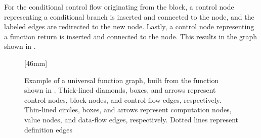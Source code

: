 %
For the conditional control flow originating from the 
\gls{block}, a \gls{control node} representing a conditional branch is inserted
and connected to the  \gls{node}, and the labeled \glspl{edge}
are redirected to the new \gls{node}.
%
Lastly, a \gls{control node} representing a \gls{function} return is inserted
and connected to the  \gls{node}.
%
This results in the \gls{graph} shown in
.

\begin{figure}
  \centering

  \mbox{}%
  \hfill%
                [46mm]%
                {%
                }%
  \hfill%
                {%
                }%
  \hfill%
  \mbox{}

  \vspace{\betweensubfigures}

                {%
                  \parbox{\textwidth}{%
                    \parbox[b]{32mm}{%
                    }%
                    \hfill%
                    \parbox[b]{63mm}{%
                      \vspace*{1cm}%
                    }%
                  }%
                }%

  \caption[Example of a universal function graph]%
          {%
            Example of a universal function graph, built from the \gls{function}
            shown in .
            Thick-lined diamonds, boxes, and arrows represent control nodes,
            block nodes, and control-flow edges, respectively.
            Thin-lined circles, boxes, and arrows represent computation nodes,
            value nodes, and data-flow edges, respectively.
            Dotted lines represent definition edges%
          }
\end{figure}

